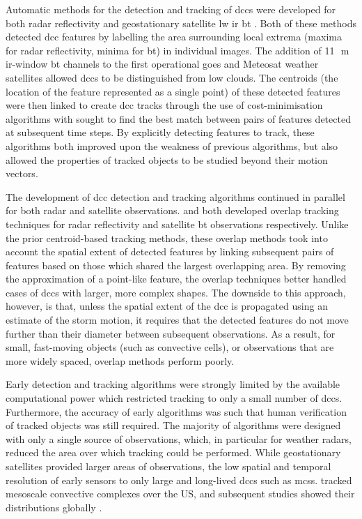 Automatic methods for the detection and tracking of \acrshort{dcc}s were developed for both radar reflectivity \citep{crane_automatic_1979} and geostationary satellite \acrshort{lw} \acrfull{ir} \acrfull{bt} \citep{endlich_automatic_1981}.
Both of these methods detected \acrshort{dcc} features by labelling the area surrounding local extrema (maxima for radar reflectivity, minima for \acrshort{bt}) in individual images.
The addition of 11\,\unit{\mu m} \acrshort{ir}-window \acrshort{bt} channels to the first operational \acrshort{goes} and Meteosat weather satellites allowed \acrshort{dcc}s to be distinguished from low clouds.
The centroids (the location of the feature represented as a single point) of these detected features were then linked to create \acrshort{dcc} tracks through the use of cost-minimisation algorithms with sought to find the best match between pairs of features detected at subsequent time steps.
By explicitly detecting features to track, these algorithms both improved upon the weakness of previous algorithms, but also allowed the properties of tracked objects to be studied beyond their motion vectors.

The development of \acrshort{dcc} detection and tracking algorithms continued in parallel for both radar and satellite observations.
\citet{rosenfeld_objective_1987} and \citet{williams_satellite-observed_1987} both developed overlap tracking techniques for radar reflectivity and satellite \acrshort{bt} observations respectively.
Unlike the prior centroid-based tracking methods, these overlap methods took into account the spatial extent of detected features by linking subsequent pairs of features based on those which shared the largest overlapping area.
By removing the approximation of a point-like feature, the overlap techniques better handled cases of \acrshort{dcc}s with larger, more complex shapes.
The downside to this approach, however, is that, unless the spatial extent of the \acrshort{dcc} is propagated using an estimate of the storm motion, it requires that the detected features do not move further than their diameter between subsequent observations.
As a result, for small, fast-moving objects (such as convective cells), or observations that are more widely spaced, overlap methods perform poorly.

Early detection and tracking algorithms were strongly limited by the available computational power which restricted tracking to only a small number of \acrshort{dcc}s. 
Furthermore, the accuracy of early algorithms was such that human verification of tracked objects was still required. 
The majority of algorithms were designed with only a single source of observations, which, in particular for weather radars, reduced the area over which tracking could be performed. 
While geostationary satellites provided larger areas of observations, the low spatial and temporal resolution of early sensors to only large and long-lived \acrshort{dcc}s such as \acrshort{mcs}s. 
\citet{maddox_mesoscale_1980a} tracked mesoscale convective complexes over the US, and subsequent studies showed their distributions globally \citep{laing_global_1997}.

